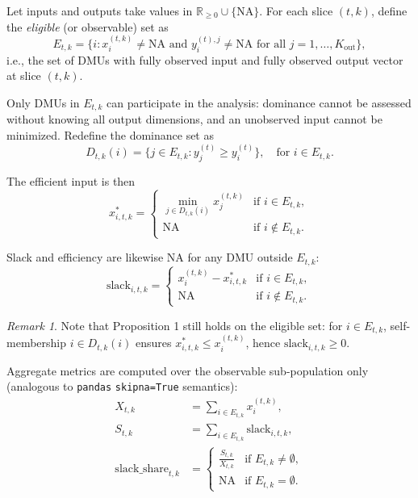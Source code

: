 \documentclass[11pt]{article}
\theoremstyle{definition}
\theoremstyle{plain}
\theoremstyle{remark}
\newtheorem{remark}{Remark}
\begin{document}
Let inputs and outputs take values in $\mathbb{R}_{\ge 0} \cup \{\text{NA}\}$. For each slice $(t,k)$, define the \emph{eligible} (or observable) set as
\begin{equation}
E_{t,k} = \{ i : x_i^{(t,k)} \ne \text{NA} \text{ and } y_i^{(t),j} \ne \text{NA} \text{ for all } j = 1, \ldots, K_{\text{out}} \},
\end{equation}
i.e., the set of DMUs with fully observed input and fully observed output vector at slice $(t,k)$.

Only DMUs in $E_{t,k}$ can participate in the analysis: dominance cannot be assessed without knowing all output dimensions, and an unobserved input cannot be minimized. Redefine the dominance set as
\[ D_{t,k}(i) = \{ j \in E_{t,k} : y_j^{(t)} \ge y_i^{(t)} \}, \quad \text{for } i \in E_{t,k}. \]

The efficient input is then
\begin{equation}
x_{i,t,k}^{*} = \begin{cases} \min_{j \in D_{t,k}(i)} x_j^{(t,k)} & \text{if } i \in E_{t,k}, \\ \text{NA} & \text{if } i \notin E_{t,k}. \end{cases}
\end{equation}

Slack and efficiency are likewise NA for any DMU outside $E_{t,k}$:
\begin{equation}
\text{slack}_{i,t,k} = \begin{cases} x_i^{(t,k)} - x_{i,t,k}^{*} & \text{if } i \in E_{t,k}, \\ \text{NA} & \text{if } i \notin E_{t,k}. \end{cases}
\end{equation}

\begin{remark}
Note that Proposition 1 still holds on the eligible set: for $i \in E_{t,k}$, self-membership $i \in D_{t,k}(i)$ ensures $x_{i,t,k}^* \le x_i^{(t,k)}$, hence $\text{slack}_{i,t,k} \ge 0$.
\end{remark}

Aggregate metrics are computed over the observable sub-population only (analogous to \texttt{pandas} \texttt{skipna=True} semantics):
\begin{align}
X_{t,k} &= \sum_{i \in E_{t,k}} x_i^{(t,k)}, \\
S_{t,k} &= \sum_{i \in E_{t,k}} \text{slack}_{i,t,k}, \\
\text{slack\_share}_{t,k} &= \begin{cases} \frac{S_{t,k}}{X_{t,k}} & \text{if } E_{t,k} \ne \emptyset, \\ \text{NA} & \text{if } E_{t,k} = \emptyset. \end{cases}
\end{align}
\end{document}
